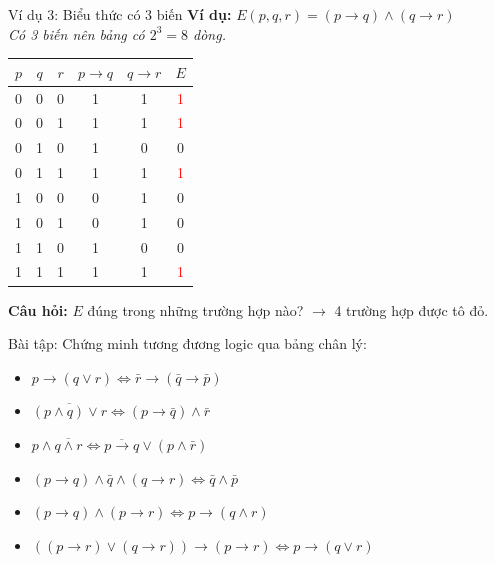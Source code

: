 \documentclass[aspectratio=169, 11pt]{beamer}
\begin{document}
\begin{frame}{Ví dụ 3: Biểu thức có 3 biến}
\textbf{Ví dụ:} $E(p, q, r) = (p \rightarrow q) \land (q \rightarrow r)$\\
\textit{Có 3 biến nên bảng có $2^3 = 8$ dòng.}

\vspace{0.2cm}
\begin{center}
\small
\begin{tabular}{|c|c|c|c|c|c|}
\hline
$p$ & $q$ & $r$ & $p \rightarrow q$ & $q \rightarrow r$ & $E$ \\
\hline
0 & 0 & 0 & 1 & 1 & \textcolor{red}{1} \\
\hline
0 & 0 & 1 & 1 & 1 & \textcolor{red}{1} \\
\hline
0 & 1 & 0 & 1 & 0 & 0 \\
\hline
0 & 1 & 1 & 1 & 1 & \textcolor{red}{1} \\
\hline
1 & 0 & 0 & 0 & 1 & 0 \\
\hline
1 & 0 & 1 & 0 & 1 & 0 \\
\hline
1 & 1 & 0 & 1 & 0 & 0 \\
\hline
1 & 1 & 1 & 1 & 1 & \textcolor{red}{1} \\
\hline
\end{tabular}
\end{center}

\vspace{0.2cm}
\textbf{Câu hỏi:} $E$ đúng trong những trường hợp nào? $\rightarrow$ 4 trường hợp được tô đỏ.
\end{frame}

\begin{frame}{Bài tập: Chứng minh tương đương logic qua bảng chân lý:}
\vspace{0.4cm}
\begin{itemize}
  \item[\textcolor{uitblue}{\textbf{b)}}] $p \rightarrow (q \lor r) \Leftrightarrow \bar{r} \rightarrow (\bar{q} \rightarrow \bar{p})$
  \vspace{0.15cm}
  \item[\textcolor{uitblue}{\textbf{c)}}] $\overline{(p \land q) \lor r} \Leftrightarrow (p \rightarrow \bar{q}) \land \bar{r}$
  \vspace{0.15cm}
  \item[\textcolor{uitblue}{\textbf{d)}}] $p \land \overline{q \land r} \Leftrightarrow \overline{p \rightarrow q} \lor (p \land \bar{r})$
  \vspace{0.15cm}
  \item[\textcolor{uitblue}{\textbf{e)}}] $(p \rightarrow q) \land \bar{q} \land (q \rightarrow r) \Leftrightarrow \bar{q} \land \bar{p}$
  \vspace{0.15cm}
  \item[\textcolor{uitblue}{\textbf{f)}}] $(p \rightarrow q) \land (p \rightarrow r) \Leftrightarrow p \rightarrow (q \land r)$
  \vspace{0.15cm}
  \item[\textcolor{uitblue}{\textbf{g)}}] $((p \rightarrow r) \lor (q \rightarrow r)) \rightarrow (p \rightarrow r) \Leftrightarrow p \rightarrow (q \lor r)$
\end{itemize}
\end{frame}
\end{document}
